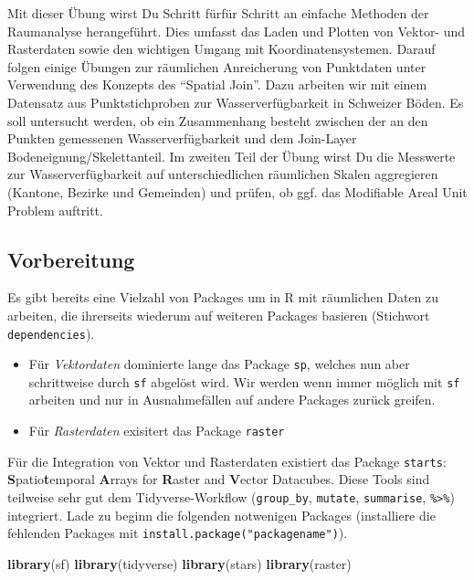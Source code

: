\documentclass[]{book}
\newenvironment{Shaded}{\begin{snugshade}}{\end{snugshade}}
\newcommand{\KeywordTok}[1]{\textcolor[rgb]{0.13,0.29,0.53}{\textbf{#1}}}
\newcommand{\NormalTok}[1]{#1}
\providecommand{\tightlist}{%
  \setlength{\itemsep}{0pt}\setlength{\parskip}{0pt}}
\begin{document}
Mit dieser Übung wirst Du Schritt fürfür Schritt an einfache Methoden der Raumanalyse herangeführt. Dies umfasst das Laden und Plotten von Vektor- und Rasterdaten sowie den wichtigen Umgang mit Koordinatensystemen. Darauf folgen einige Übungen zur räumlichen Anreicherung von Punktdaten unter Verwendung des Konzepts des ``Spatial Join''. Dazu arbeiten wir mit einem Datensatz aus Punktstichproben zur Wasserverfügbarkeit in Schweizer Böden. Es soll untersucht werden, ob ein Zusammenhang besteht zwischen der an den Punkten gemessenen Wasserverfügbarkeit und dem Join-Layer Bodeneignung/Skelettanteil. Im zweiten Teil der Übung wirst Du die Messwerte zur Wasserverfügbarkeit auf unterschiedlichen räumlichen Skalen aggregieren (Kantone, Bezirke und Gemeinden) und prüfen, ob ggf. das Modifiable Areal Unit Problem auftritt.

\hypertarget{vorbereitung}{%
\subsection{Vorbereitung}\label{vorbereitung}}

Es gibt bereits eine Vielzahl von Packages um in R mit räumlichen Daten zu arbeiten, die ihrerseits wiederum auf weiteren Packages basieren (Stichwort \texttt{dependencies}).

\begin{itemize}
\tightlist
\item
  Für \emph{Vektordaten} dominierte lange das Package \texttt{sp}, welches nun aber schrittweise durch \texttt{sf} abgelöst wird. Wir werden wenn immer möglich mit \texttt{sf} arbeiten und nur in Ausnahmefällen auf andere Packages zurück greifen.
\item
  Für \emph{Rasterdaten} exisitert das Package \texttt{raster}
\end{itemize}

Für die Integration von Vektor und Rasterdaten existiert das Package \texttt{starts}: \textbf{S}patio\textbf{t}emporal \textbf{A}rrays for \textbf{R}aster and \textbf{V}ector Datacubes. Diese Tools sind teilweise sehr gut dem Tidyverse-Workflow (\texttt{group\_by}, \texttt{mutate}, \texttt{summarise}, \texttt{\%\textgreater{}\%}) integriert. Lade zu beginn die folgenden notwenigen Packages (installiere die fehlenden Packages mit \texttt{install.package("packagename")}).

\begin{Shaded}
\begin{Highlighting}[]
\KeywordTok{library}\NormalTok{(sf)}
\KeywordTok{library}\NormalTok{(tidyverse)}
\KeywordTok{library}\NormalTok{(stars)}
\KeywordTok{library}\NormalTok{(raster)}
\end{Highlighting}
\end{Shaded}
\end{document}
